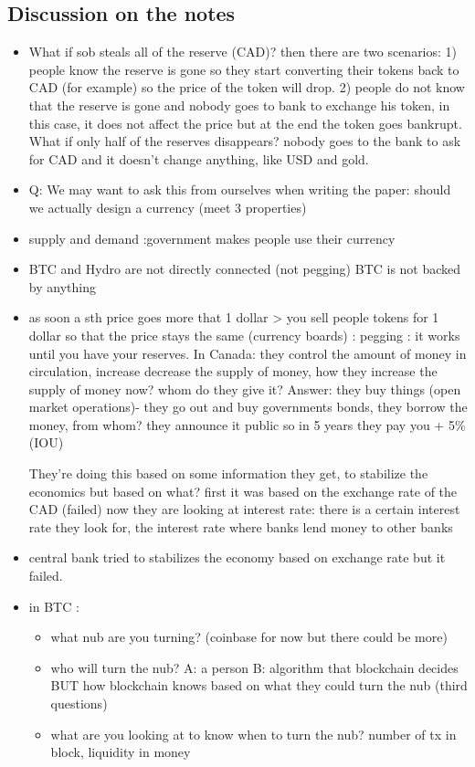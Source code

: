 \subsection {Discussion on the notes}
\begin{itemize}
\item What if sob steals all of the reserve (CAD)? then there are two scenarios: 1) people know the reserve is gone so they start converting their tokens back to CAD (for example) so the price of the token will drop. 2) people do not know that the reserve is gone and nobody goes to bank to exchange his token, in this case, it does not affect the price but at the end the token goes bankrupt.
What if only half of the reserves disappears? nobody goes to the bank to ask for CAD and  it doesn’t change anything, like USD and gold.

\item Q: We may want to ask this from ourselves when writing the paper: should we actually design a currency (meet 3 properties)

\item supply and demand :government makes people use their currency

\item BTC and Hydro are not directly connected (not pegging) BTC is not backed by anything

\item  as soon a sth price goes more that 1 dollar > you sell people tokens for 1 dollar so that the price stays the same (currency boards) : pegging : it works until you have your reserves.
In Canada: they control the amount of money in circulation, increase decrease the supply of money, how they increase the supply of money now? whom do they give it? Answer: they buy things (open market operations)- they go out and buy governments bonds, they borrow the money, from whom? they announce it public so in 5 years they pay you + 5\% (IOU) \par
They’re doing this based on some information they get, to stabilize the economics but based on what? first it was based on the exchange rate of the CAD (failed) now they are looking at interest rate: there is a certain interest rate they look for, the interest rate where banks lend money to other banks

\item central bank tried to stabilizes the economy based on exchange rate but it failed.
\item in BTC :
\begin {itemize}
\item what nub are you turning? (coinbase for now but there could be more)
\item who will turn the nub? A: a  person B: algorithm that blockchain decides BUT how blockchain knows based on what they could turn the nub (third questions)
\item what are you looking at to know when to turn the nub? number of tx in block, liquidity in money
\end{itemize}


\end{itemize}
